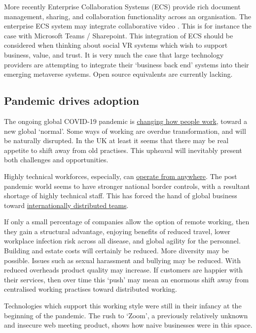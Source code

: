 More recently Enterprise Collaboration Systems (ECS) provide rich document management, sharing, and collaboration functionality across an organisation. The enterprise ECS system may integrate collaborative video \cite{prakash2020characteristic}. This is for instance the case with Microsoft Teams / Sharepoint. This integration of ECS should be considered when thinking about social VR systems which wish to support business, value, and trust. It is very much the case that large technology providers are attempting to integrate their `business back end' systems into their emerging metaverse systems. Open source equivalents are currently lacking.
\subsection{Pandemic drives adoption}
The ongoing global COVID-19 pandemic is \href{https://blog.yelp.com/news/the-future-of-work-is-remote/}{changing how people work}, toward a new global `normal'. Some ways of working are overdue transformation, and will be naturally disrupted. In the UK at least it seems that there may be real appetite to shift away from old practises. This upheaval will inevitably present both challenges and opportunities.\par
Highly technical workforces, especially, can \href{https://globalworkplaceanalytics.com/telecommuting-statistics}{operate from anywhere}. The post pandemic world seems to have stronger national border controls, with a resultant shortage of highly technical staff. This has forced the hand of global business toward \href{https://www.lifeatspotify.com/being-here/work-from-anywhere}{internationally distributed teams}. \par
If only a small percentage of companies allow the option of remote working, then they gain a structural advantage, enjoying benefits of reduced travel, lower workplace infection risk across all disease, and global agility for the personnel. Building and estate costs will certainly be reduced. More diversity may be possible. Issues such as sexual harassment and bullying may be reduced.  With reduced overheads product quality may increase. If customers are happier with their services, then over time this `push' may mean an enormous shift away from centralised working practises toward distributed working. \par
Technologies which support this working style were still in their infancy at the beginning of the pandemic. The rush to `Zoom', a previously relatively unknown and insecure \cite{aiken2020zooming} web meeting product, shows how naive businesses were in this space. \par

